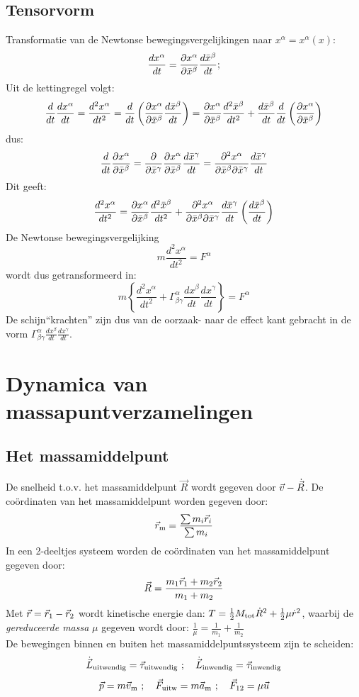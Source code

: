 \documentclass[twoside]{report}
\begin{document}
\subsection{Tensorvorm}
Transformatie van de Newtonse bewegingsvergelijkingen naar $x^\alpha=x^\alpha(x)$:
\[
\frac{dx^\alpha}{dt}=\frac{\partial x^\alpha}{\partial \bar{x}^\beta}\frac{d\bar{x}^\beta}{dt};
\]
Uit de kettingregel volgt:
\[
\frac{d}{dt}\frac{dx^\alpha}{dt}=\frac{d^2x^\alpha}{dt^2}=\frac{d}{dt}
\left(\frac{\partial x^\alpha}{\partial \bar{x}^\beta}\frac{d\bar{x}^\beta}{dt}\right)=
\frac{\partial x^\alpha}{\partial \bar{x}^\beta}\frac{d^2\bar{x}^\beta}{dt^2}+
\frac{d\bar{x}^\beta}{dt}\frac{d}{dt}\left(\frac{\partial x^\alpha}{\partial \bar{x}^\beta}\right)
\]
dus:
\[
\frac{d}{dt}\frac{\partial x^\alpha}{\partial \bar{x}^\beta}=\frac{\partial }{\partial \bar{x}^\gamma}\frac{\partial x^\alpha}{\partial \bar{x}^\beta}\frac{d\bar{x}^\gamma}{dt}=
\frac{\partial^2x^\alpha}{\partial\bar{x}^\beta\partial\bar{x}^\gamma}\frac{d\bar{x}^\gamma}{dt}
\]
Dit geeft:
\[
\frac{d^2x^\alpha}{dt^2}=\frac{\partial x^\alpha}{\partial \bar{x}^\beta}\frac{d^2\bar{x}^\beta}{dt^2}+
\frac{\partial^2x^\alpha}{\partial\bar{x}^\beta\partial\bar{x}^\gamma}\frac{d\bar{x}^\gamma}{dt}
\left(\frac{d\bar{x}^\beta}{dt}\right)
\]
De Newtonse bewegingsvergelijking
\[
m\frac{d^2x^\alpha}{dt^2}=F^\alpha
\]
wordt dus getransformeerd in:
\[
m\left\{\frac{d^2x^\alpha}{dt^2}+\Gamma_{\beta\gamma}^\alpha
\frac{dx^\beta}{dt}\frac{dx^\gamma}{dt}\right\}=F^\alpha
\]
De schijn``krachten'' zijn dus van de oorzaak- naar de effect kant gebracht in
de vorm $\displaystyle\Gamma_{\beta\gamma}^\alpha\frac{dx^\beta}{dt}\frac{dx^\gamma}{dt}$.

\section{Dynamica van massapuntverzamelingen}
\subsection{Het massamiddelpunt}
De snelheid t.o.v. het massamiddelpunt $\vec{R}$ wordt gegeven door $\vec{v}-\dot{\vec{R}}$.
De co\"ordinaten van het massamiddelpunt worden gegeven door:
\[
\vec{r}_{\rm m}=\frac{\sum m_i\vec{r}_i}{\sum m_i}
\]
In een 2-deeltjes systeem worden de co\"ordinaten van het massamiddelpunt
gegeven door:
\[
\vec{R}=\frac{m_1\vec{r}_1+m_2\vec{r}_2}{m_1+m_2}
\]
Met $\vec{r}=\vec{r}_1-\vec{r}_2$ wordt kinetische energie dan:
$T=\mbox{$\frac{1}{2}$} M_{\rm tot}\dot{R}^2+\mbox{$\frac{1}{2}$}\mu\dot{r}^2$, waarbij de
{\it gereduceerde massa} $\mu$ gegeven wordt door:
$\displaystyle\frac{1}{\mu}=\frac{1}{m_1}+\frac{1}{m_2}$\\
De bewegingen binnen en buiten het massamiddelpuntssysteem zijn te scheiden:
\[
\dot{\vec{L}}_{\rm uitwendig}=\vec{\tau}_{\rm uitwendig}~;~~~
\dot{\vec{L}}_{\rm inwendig}=\vec{\tau}_{\rm inwendig}
\]
\[
\vec{p}=m\vec{v}_{\rm m}~;~~~\vec{F}_{\rm uitw}=m\vec{a}_{\rm m}~;~~~\vec{F}_{12}=\mu\vec{u}
\]
\end{document}
